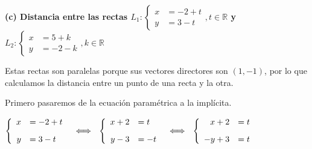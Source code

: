 \documentclass[11pt]{article}
\newcommand{\indicador}[4]{
{\tikz[remember picture,overlay]\coordinate (#1) at #2;}{\tikz[remember picture,overlay]\coordinate (#3) at #4;} 
}
\newcommand{\marka}[2]{
{\tikz[remember picture,overlay]\coordinate (#1) at #2;}
}
\begin{document}
\begin{enumerate}[\hspace{-5mm} 1) ]
\begin{minipage}{.25\textwidth}
\begin{center}
\end{center}


\end{minipage}









\textbf{(c) Distancia entre las rectas $L_1 : \begin{cases} x &= -2 + t \\ y &= 3 - t \end{cases}, t \in \mathbb{R}$ y $L_2 : \begin{cases} x &= 5 + k \\ y &= -2 - k \end{cases}, k \in \mathbb{R}$}


Estas rectas son paralelas porque sus vectores directores son $(1, -1)$, por lo que calculamos la distancia entre un punto de una recta y la otra.

Primero pasaremos de la ecuación paramétrica a la implícita.


$\left\{
    \begin{array}{rl}
         x&= -2+t 
         \\[3mm]
        y & =3-t 
    \end{array}
    \right.
\ \ 
\Longleftrightarrow
\ \ 
\left\{
    \begin{array}{rl}
         x+2&=t  
         \\[3mm]
        y-3 & =-t  
    \end{array}
    \right.
\ \ 
\Longleftrightarrow
\ \ 
\left\{
    \begin{array}{rl}
         x+2&=t  \indicador{x}{(.1,.15)}{y}{(.8,-.35)}\marka{z}{(1.3,-.35)}
         \\[3mm]
        -y+3 & =t   \marka{t}{(.1,.15)} 
    \end{array}
    \right.
$


\end{enumerate}
\end{document}
